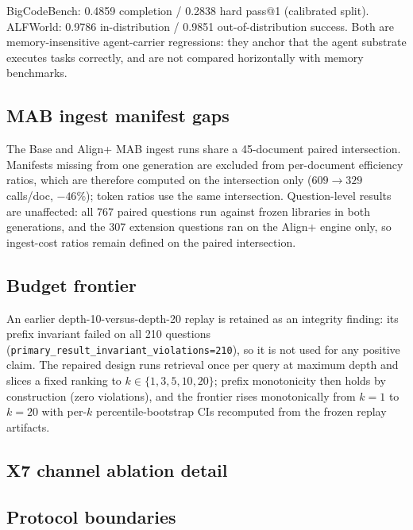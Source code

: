 BigCodeBench: 0.4859 completion / 0.2838 hard pass@1 (calibrated split). ALFWorld: 0.9786 in-distribution / 0.9851 out-of-distribution success. Both are memory-insensitive agent-carrier regressions: they anchor that the agent substrate executes tasks correctly, and are not compared horizontally with memory benchmarks.

\subsection{MAB ingest manifest gaps}
\label{app:manifest-gaps}

The Base and Align+ MAB ingest runs share a 45-document paired intersection. Manifests missing from one generation are excluded from per-document efficiency ratios, which are therefore computed on the intersection only ($609{\to}329$ calls/doc, $-46\%$); token ratios use the same intersection. Question-level results are unaffected: all 767 paired questions run against frozen libraries in both generations, and the 307 extension questions ran on the Align+ engine only, so ingest-cost ratios remain defined on the paired intersection.

\subsection{Budget frontier}
\label{app:budget}

An earlier depth-10-versus-depth-20 replay is retained as an integrity finding: its prefix invariant failed on all 210 questions (\texttt{primary\_result\_invariant\_violations=210}), so it is not used for any positive claim. The repaired design runs retrieval once per query at maximum depth and slices a fixed ranking to $k\in\{1,3,5,10,20\}$; prefix monotonicity then holds by construction (zero violations), and the frontier rises monotonically from $k{=}1$ to $k{=}20$ with per-$k$ percentile-bootstrap CIs recomputed from the frozen replay artifacts.

\subsection{X7 channel ablation detail}




\subsection{Protocol boundaries}


